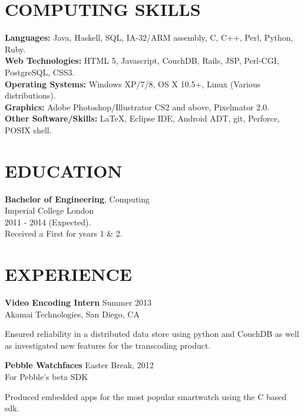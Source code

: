 \documentclass[line,margin]{res}
\newenvironment{myindentpar}[1]
 {\begin{list}{}
         {\setlength{\leftmargin}{#1}}
         \item[]
 }
 {\end{list}}
\begin{document}
\address{\addr}
\address{\email / \phone}
 
\begin{resume}
 
\section{COMPUTING SKILLS}       
\textbf{Languages:} Java, Haskell, SQL, IA-32/ARM assembly, C, C++, Perl, Python, Ruby. \\
\textbf{Web Technologies:} HTML 5, Javascript, CouchDB, Rails, JSP, Perl-CGI, PostgreSQL, CSS3. \\
\textbf{Operating Systems:} Windows XP/7/8, OS X 10.5+, Linux (Various distributions). \\
\textbf{Graphics:} Adobe Photoshop/Illustrator CS2 and above, Pixelmator 2.0. \\
\textbf{Other Software/Skills:} \LaTeX , Eclipse IDE, Android ADT, git, Perforce, POSIX shell. 
\section{EDUCATION} 
\textbf{Bachelor of Engineering}, Computing \\
                Imperial College London \\
                2011 - 2014 (Expected). \\
                Received a First for years 1 \& 2.   
 
\section{EXPERIENCE}
                \textbf{Video Encoding Intern} \hfill Summer 2013 \\
                 Akamai Technologies, San Diego, CA
                 \begin{myindentpar}{1cm}
                 Ensured reliability in a distributed data store using python and CouchDB as well as investigated new features for the transcoding product.
                 \end{myindentpar}
                 
                 \textbf{Pebble Watchfaces} \hfill Easter Break, 2012 \\
                 For Pebble's beta SDK
                \begin{myindentpar}{1cm}
				    Produced embedded apps for the most popular smartwatch using the C based sdk.     
			   \end{myindentpar}


\end{resume}
\end{document}
